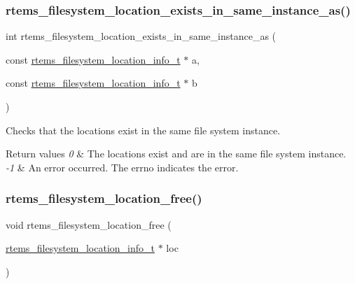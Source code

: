 \subsubsection{\texorpdfstring{rtems\_filesystem\_location\_exists\_in\_same\_instance\_as()}{rtems\_filesystem\_location\_exists\_in\_same\_instance\_as()}}
{\footnotesize\ttfamily int rtems\+\_\+filesystem\+\_\+location\+\_\+exists\+\_\+in\+\_\+same\+\_\+instance\+\_\+as (\begin{DoxyParamCaption}\item[{const \mbox{\hyperlink{group__LibIO_ga3252b3d31ee3c49ffff0b7604a676864}{rtems\+\_\+filesystem\+\_\+location\+\_\+info\+\_\+t}} $\ast$}]{a,  }\item[{const \mbox{\hyperlink{group__LibIO_ga3252b3d31ee3c49ffff0b7604a676864}{rtems\+\_\+filesystem\+\_\+location\+\_\+info\+\_\+t}} $\ast$}]{b }\end{DoxyParamCaption})}



Checks that the locations exist in the same file system instance. 


\begin{DoxyRetVals}{Return values}
{\em 0} & The locations exist and are in the same file system instance. \\
\hline
{\em -\/1} & An error occurred. The {\ttfamily errno} indicates the error. \\
\hline
\end{DoxyRetVals}
\mbox{\label{group__LibIOInternal_ga9b7b1dc3036af3d9e03ce5723420f9c4}} 
\subsubsection{\texorpdfstring{rtems\_filesystem\_location\_free()}{rtems\_filesystem\_location\_free()}}
{\footnotesize\ttfamily void rtems\+\_\+filesystem\+\_\+location\+\_\+free (\begin{DoxyParamCaption}\item[{\mbox{\hyperlink{group__LibIO_ga3252b3d31ee3c49ffff0b7604a676864}{rtems\+\_\+filesystem\+\_\+location\+\_\+info\+\_\+t}} $\ast$}]{loc }\end{DoxyParamCaption})}



